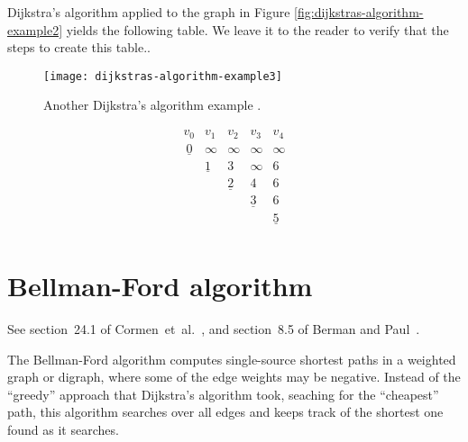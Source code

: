 \begin{exercise}
{\rm
Dijkstra's algorithm applied to the graph in Figure
\ref{fig:dijkstras-algorithm-example2} yields the following
table. We leave it to the reader to verify that 
the steps to create this table..

\begin{figure}[h!]
\begin{center}
\texttt{[image: dijkstras-algorithm-example3]}
\end{center}
\caption{Another Dijkstra's algorithm example . }
\label{fig:dijkstras-algorithm-example3}
\end{figure}

\[
\begin{array}{ccccc}
v_0  & v_1  & v_2     &  v_3     & v_4  \\\
\underline{0}    & \infty & \infty & \infty & \infty \\
      & \underline{1}      & 3        & \infty & 6 \\
      &     &    \underline{2}    &  4     &    6       \\
      &     &                            &  \underline{3}     &   6      \\
      &          &            &           & \underline{5}  \\
\end{array}
\]
}
\end{exercise}


\section{Bellman-Ford algorithm}

See section~24.1 of Cormen~et~al.~\cite{CormenEtAl2001}, and
section~8.5 of Berman and Paul~\cite{BermanPaul1997}.

The Bellman-Ford algorithm computes single-source shortest paths in a weighted 
graph or digraph, where some of the edge weights may be negative.
Instead of the ``greedy'' approach that Dijkstra's algorithm took, 
seaching for the ``cheapest'' path, this algorithm searches over all
edges and keeps track of the shortest one found as it searches.


